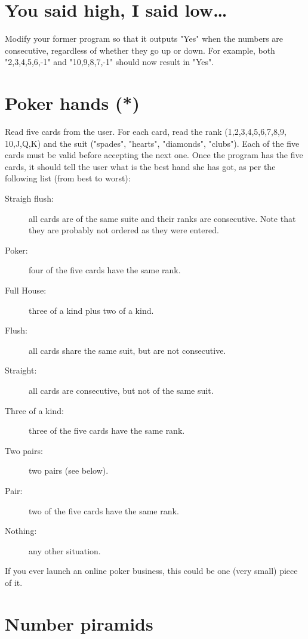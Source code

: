 \documentclass{article}
\begin{document}
\section{You said high, I said low\ldots}
\label{sec:you-said-high}

Modify your former program so that it outputs "Yes" when the numbers
are consecutive, regardless of whether they go up or down. For
example, both "2,3,4,5,6,-1" and "10,9,8,7,-1" should now result in
"Yes".

\section{Poker hands (*)}
\label{sec:poker-hands}

Read five cards from the user. For each card, read the rank
(1,2,3,4,5,6,7,8,9, 10,J,Q,K) and the suit ("spades", "hearts",
"diamonds", "clubs"). Each of the five cards must be valid before
accepting the next one.  Once the program has the five cards, it
should tell the user what is the best hand she has got, as per the
following list (from best to worst):

\begin{description}
\item[Straigh flush: ] all cards are of the same suite and
     their ranks are consecutive. Note that they are probably
     not ordered as they were entered.
   \item[Poker: ] four of the five cards have the same
     rank.
   \item[Full House: ] three of a kind plus two of a kind.
   \item[Flush: ] all cards share the same suit, but are not
     consecutive.
   \item[Straight: ] all cards are consecutive, but not of the same
     suit.
   \item[Three of a kind: ] three of the five cards have the same
     rank.
   \item[Two pairs: ] two pairs (see below).
   \item[Pair:] two of the five cards have the same rank.
   \item[Nothing: ] any other situation.
\end{description}

If you ever launch an online poker business, this could be one (very
small) piece of it.

\section{Number piramids}
\label{sec:number-piramids}
\end{document}
